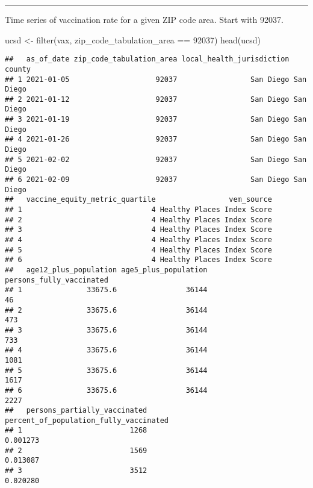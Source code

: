 \documentclass[
]{article}
\newenvironment{Shaded}{\begin{snugshade}}{\end{snugshade}}
\newcommand{\DecValTok}[1]{\textcolor[rgb]{0.00,0.00,0.81}{#1}}
\newcommand{\FunctionTok}[1]{\textcolor[rgb]{0.00,0.00,0.00}{#1}}
\newcommand{\NormalTok}[1]{#1}
\newcommand{\OtherTok}[1]{\textcolor[rgb]{0.56,0.35,0.01}{#1}}
\newcommand{\SpecialCharTok}[1]{\textcolor[rgb]{0.00,0.00,0.00}{#1}}
\begin{document}
\begin{center}\rule{0.5\linewidth}{0.5pt}\end{center}

Time series of vaccination rate for a given ZIP code area. Start with
92037.

\begin{Shaded}
\begin{Highlighting}[]
\NormalTok{ucsd }\OtherTok{\textless{}{-}} \FunctionTok{filter}\NormalTok{(vax, zip\_code\_tabulation\_area }\SpecialCharTok{==} \DecValTok{92037}\NormalTok{)}
\FunctionTok{head}\NormalTok{(ucsd)}
\end{Highlighting}
\end{Shaded}

\begin{verbatim}
##   as_of_date zip_code_tabulation_area local_health_jurisdiction    county
## 1 2021-01-05                    92037                 San Diego San Diego
## 2 2021-01-12                    92037                 San Diego San Diego
## 3 2021-01-19                    92037                 San Diego San Diego
## 4 2021-01-26                    92037                 San Diego San Diego
## 5 2021-02-02                    92037                 San Diego San Diego
## 6 2021-02-09                    92037                 San Diego San Diego
##   vaccine_equity_metric_quartile                 vem_source
## 1                              4 Healthy Places Index Score
## 2                              4 Healthy Places Index Score
## 3                              4 Healthy Places Index Score
## 4                              4 Healthy Places Index Score
## 5                              4 Healthy Places Index Score
## 6                              4 Healthy Places Index Score
##   age12_plus_population age5_plus_population persons_fully_vaccinated
## 1               33675.6                36144                       46
## 2               33675.6                36144                      473
## 3               33675.6                36144                      733
## 4               33675.6                36144                     1081
## 5               33675.6                36144                     1617
## 6               33675.6                36144                     2227
##   persons_partially_vaccinated percent_of_population_fully_vaccinated
## 1                         1268                               0.001273
## 2                         1569                               0.013087
## 3                         3512                               0.020280

\end{verbatim}
\end{document}
